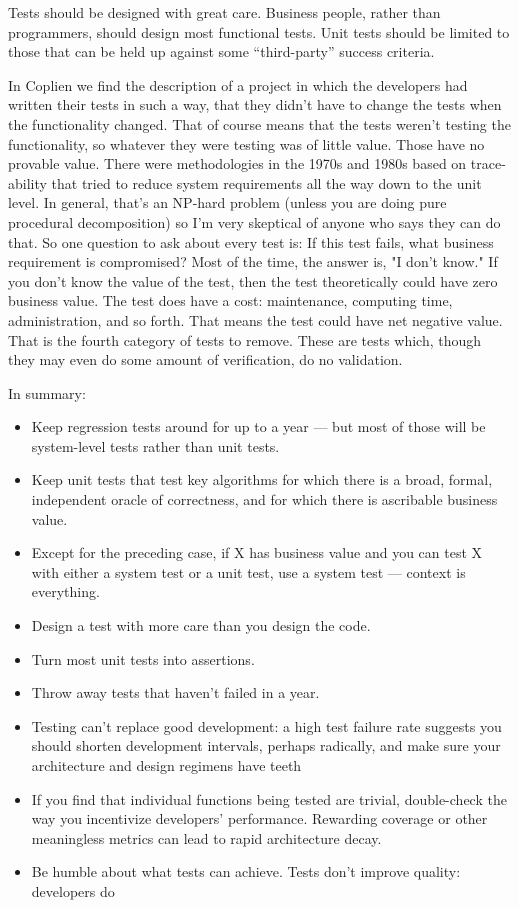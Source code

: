 \documentclass{article}
\begin{document}
Tests should be designed with great care. Business people, rather than programmers, should design most functional tests. Unit tests should be limited to those that can be held up against some “third-party” success criteria.

In Coplien \cite{WEBSITE:UnitTestIsWaste} we find the description of a project in which the developers had written their tests in such a way, that they didn't have to change the tests when the functionality changed. That of course means that the tests  weren't testing the functionality, so whatever they were testing was of little value. Those have no provable value. There were methodologies in the 1970s and 1980s based on trace-ability that tried to reduce system requirements all the way down to the unit level. In general, that's an NP-hard problem (unless you are doing pure procedural decomposition) so I'm very skeptical of anyone who says they can do that. So one question to ask about every test is: If this test fails, what business requirement is compromised? Most of the time, the answer is, "I don't know." If you don't know the value of the test, then the test theoretically could have zero business value. The test does have a cost: maintenance, computing time, administration, and so forth. That means the test could have net negative value. That is the fourth category of tests to remove. These are tests which, though they may even do some amount of verification, do no validation.

In summary: 
\begin{itemize}
	\item Keep regression tests around for up to a year — but most of those will be system-level tests rather than unit tests. 
	\item Keep unit tests that test key algorithms for which there is a broad, formal, independent oracle of correctness, and for which there is ascribable business value.
	\item  Except for the preceding case, if X has business value and you can test X with either a system test or a unit test, use a system test — context is everything.
	\item Design a test with more care than you design the code.
	\item Turn most unit tests into assertions.
	\item Throw away tests that haven’t failed in a year.
	\item Testing can’t replace good development: a high test failure 
rate suggests you should shorten development intervals, 
perhaps radically, and make sure your architecture and design 
regimens have teeth
	\item If you find that individual functions being tested are trivial, 
double-check the way you incentivize developers’ 
performance. Rewarding coverage or other meaningless 
metrics can lead to rapid architecture decay.
	\item Be humble about what tests can achieve. Tests don’t improve 
quality: developers do
\end{itemize}
\end{document}
